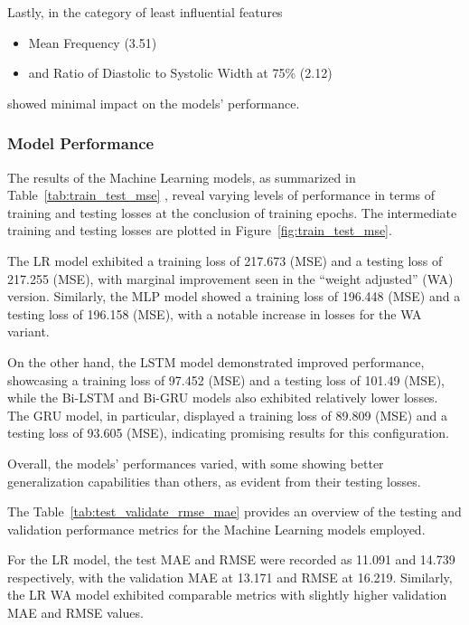 Lastly, in the category of least influential features
\begin{itemize}[itemsep=2pt]
    \item Mean Frequency (3.51)
    \item and Ratio of Diastolic to Systolic Width at 75\% (2.12)
\end{itemize}
showed minimal impact on the models' performance.

\subsubsection{Model Performance}
\label{subsubsec:model_performance}

The results of the Machine Learning models, as summarized in Table~\ref{tab:train_test_mse} , reveal varying levels of performance in terms of training and testing losses at the conclusion of training epochs.
The intermediate training and testing losses are plotted in Figure~\ref{fig:train_test_mse}.

The LR model exhibited a training loss of 217.673 (MSE) and a testing loss of 217.255 (MSE), with marginal improvement seen in the \enquote{weight adjusted} (WA) version.
Similarly, the MLP model showed a training loss of 196.448 (MSE) and a testing loss of 196.158 (MSE), with a notable increase in losses for the WA variant.

On the other hand, the LSTM model demonstrated improved performance, showcasing a training loss of 97.452 (MSE) and a testing loss of 101.49 (MSE), while the Bi-LSTM and Bi-GRU models also exhibited relatively lower losses.
The GRU model, in particular, displayed a training loss of 89.809 (MSE) and a testing loss of 93.605 (MSE), indicating promising results for this configuration.

Overall, the models' performances varied, with some showing better generalization capabilities than others, as evident from their testing losses.

\vspace{0.2cm}

The Table~\ref{tab:test_validate_rmse_mae} provides an overview of the testing and validation performance metrics for the Machine Learning models employed.

For the LR model, the test MAE and RMSE were recorded as 11.091 and 14.739 respectively, with the validation MAE at 13.171 and RMSE at 16.219.
Similarly, the LR WA model exhibited comparable metrics with slightly higher validation MAE and RMSE values.

